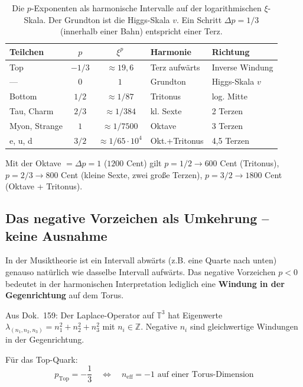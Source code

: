 \begin{table}[htbp]
\centering\small
\begin{tabular}{lccll}
\toprule
\textbf{Teilchen} & $p$ & \textbf{$\xi^p$} & \textbf{Harmonie} & \textbf{Richtung} \\
\midrule
Top     & $-1/3$ & ${\approx}19{,}6$ & Terz aufwärts  & Inverse Windung \\
---     & $0$    & $1$               & Grundton       & Higgs-Skala $v$ \\
Bottom  & $1/2$  & ${\approx}1/87$   & Tritonus       & log. Mitte \\
Tau, Charm & $2/3$ & ${\approx}1/384$ & kl. Sexte     & 2 Terzen \\
Myon, Strange & $1$ & ${\approx}1/7500$ & Oktave      & 3 Terzen \\
e, u, d & $3/2$  & ${\approx}1/65{\cdot}10^4$ & Okt.+Tritonus & 4,5 Terzen \\
\bottomrule
\end{tabular}
\caption{Die $p$-Exponenten als harmonische Intervalle auf der
logarithmischen $\xi$-Skala. Der Grundton ist die Higgs-Skala $v$.
Ein Schritt $\Delta p = 1/3$ (innerhalb einer Bahn) entspricht einer Terz.}
\label{tab:harmonisch}
\end{table}
\noindent Mit der Oktave $= \Delta p = 1$ ($1200$ Cent) gilt $p = 1/2 \to 600$ Cent (Tritonus), $p = 2/3 \to 800$ Cent (kleine Sexte, zwei große Terzen), $p = 3/2 \to 1800$ Cent (Oktave + Tritonus).

\subsection{Das negative Vorzeichen als Umkehrung -- keine Ausnahme}

In der Musiktheorie ist ein Intervall abwärts (z.B. eine Quarte nach
unten) genauso natürlich wie dasselbe Intervall aufwärts. Das
negative Vorzeichen $p < 0$ bedeutet in der harmonischen Interpretation
lediglich eine \textbf{Windung in der Gegenrichtung} auf dem Torus.

Aus Dok.~159: Der Laplace-Operator auf $\mathbb{T}^3$ hat Eigenwerte
$\lambda_{(n_1,n_2,n_3)} = n_1^2 + n_2^2 + n_3^2$ mit
$n_i \in \mathbb{Z}$. Negative $n_i$ sind gleichwertige Windungen
in der Gegenrichtung.

Für das Top-Quark:
\begin{equation}
    p_{\text{Top}} = -\frac{1}{3}
    \quad \Longleftrightarrow \quad
    n_{\text{eff}} = -1 \text{ auf einer Torus-Dimension}
\end{equation}

